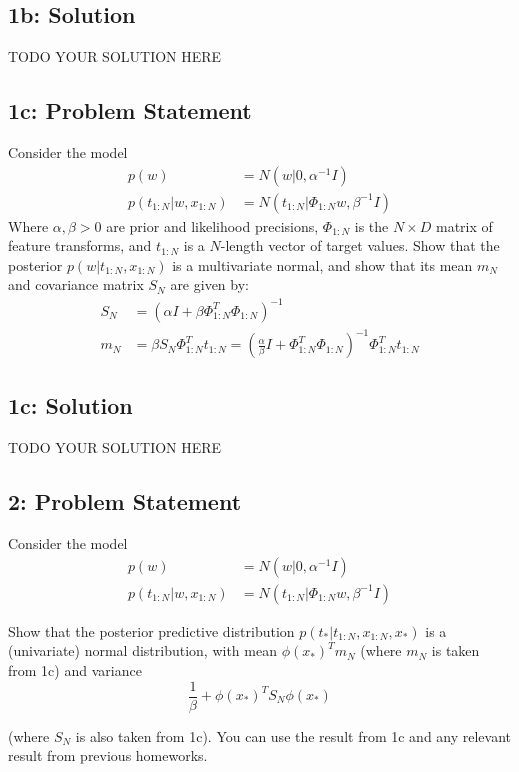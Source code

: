 \documentclass[10pt]{article}
\newcommand{\officialdirections}[1]{{\color{purple} #1}}
\begin{document}
\subsection{1b: Solution}
TODO YOUR SOLUTION HERE



\newpage
\officialdirections{\subsection*{1c: Problem Statement}
Consider the model
\begin{align*}
p(w) &= N(w|0,\alpha^{-1} I)\\
p(t_{1:N}|w,x_{1:N}) &= N(t_{1:N}|\Phi_{1:N} w, \beta^{-1} I)
\end{align*}
Where $\alpha,\beta > 0$ are prior and likelihood precisions, $\Phi_{1:N}$ is the $N \times D$ matrix of feature transforms, and $t_{1:N}$ is a $N$-length vector of target values. Show that the posterior $p(w|t_{1:N},x_{1:N})$ is a multivariate normal, and show that its mean $m_N$ and covariance matrix $S_N$ are given by:
\begin{align*}
S_N &= (\alpha I + \beta \Phi_{1:N}^T \Phi_{1:N})^{-1}\\
m_N &= \beta S_N \Phi_{1:N}^T t_{1:N} = \left(\frac{\alpha}{\beta} I + \Phi_{1:N}^T \Phi_{1:N}\right)^{-1} \Phi_{1:N}^T t_{1:N}
\end{align*}
}

\subsection{1c: Solution}
TODO YOUR SOLUTION HERE

\newpage
\officialdirections{\subsection*{2: Problem Statement}
Consider the model
\begin{align*}
p(w) &= N(w|0,\alpha^{-1} I)\\
p(t_{1:N}|w,x_{1:N}) &= N(t_{1:N}|\Phi_{1:N} w, \beta^{-1} I)
\end{align*}

Show that the posterior predictive distribution $p(t_*|t_{1:N},x_{1:N},x_*)$ is a (univariate) normal distribution, with mean $\phi(x_*)^Tm_N$ (where $m_N$ is taken from 1c) and variance
\begin{equation*}
\frac{1}{\beta} + \phi(x_*)^T S_N \phi(x_*)
\end{equation*}

(where $S_N$ is also taken from 1c). You can use the result from 1c and any relevant result from previous homeworks.
}
\end{document}
